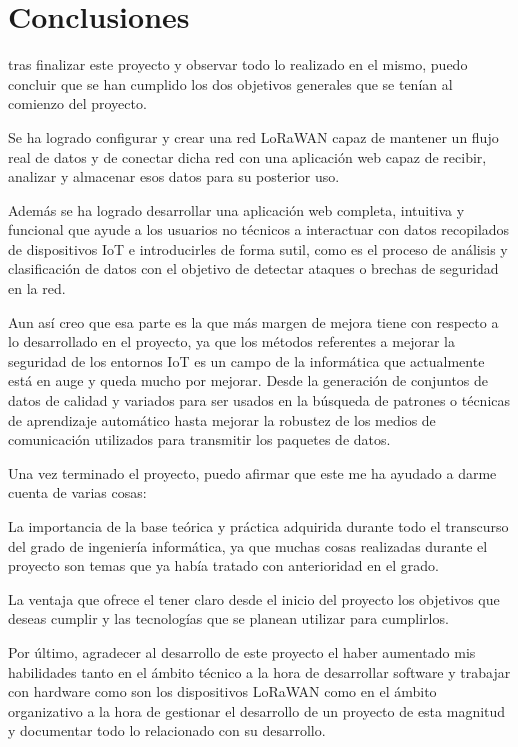 

\section{Conclusiones}
tras finalizar este proyecto y observar todo lo realizado en el mismo, puedo concluir que se han cumplido los dos objetivos generales que se tenían al comienzo del proyecto.

Se ha logrado configurar y crear una red LoRaWAN capaz de mantener un flujo real de datos y de conectar dicha red con una aplicación web capaz de recibir, analizar y almacenar esos datos para su posterior uso.

Además se ha logrado desarrollar una aplicación web completa, intuitiva y funcional que ayude a los usuarios no técnicos a interactuar con datos recopilados de dispositivos IoT e introducirles de forma sutil, como es el proceso de análisis y clasificación de datos con el objetivo de detectar ataques o brechas de seguridad en la red. 

Aun así creo que esa parte es la que más margen de mejora tiene con respecto a lo desarrollado en el proyecto, ya que los métodos referentes a mejorar la seguridad de los entornos IoT es un campo de la informática que actualmente está en auge y queda mucho por mejorar. Desde la generación de conjuntos de datos de calidad y variados para ser usados en la búsqueda de patrones o técnicas de aprendizaje automático hasta mejorar la robustez de los medios de comunicación utilizados para transmitir los paquetes de datos.

Una vez terminado el proyecto, puedo afirmar que este me ha ayudado a darme cuenta de varias cosas:

La importancia de la base teórica y práctica adquirida durante todo el transcurso del grado de ingeniería informática, ya que muchas cosas realizadas durante el proyecto son temas que ya había tratado con anterioridad en el grado.

La ventaja que ofrece el tener claro desde el inicio del proyecto los objetivos que deseas cumplir y las tecnologías que se planean utilizar para cumplirlos.

Por último, agradecer al desarrollo de este proyecto el haber aumentado mis habilidades tanto en el ámbito técnico a la hora de desarrollar software y trabajar con hardware como son los dispositivos LoRaWAN como en el ámbito organizativo a la hora de gestionar el desarrollo de un proyecto de esta magnitud y documentar todo lo relacionado con su desarrollo.


